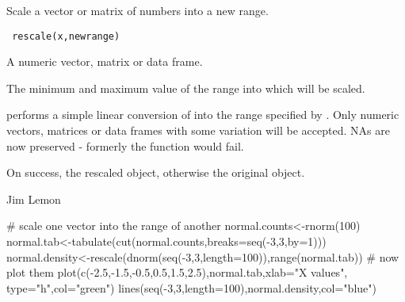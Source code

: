 \begin{Description}\relax
Scale a vector or matrix of numbers into a new range.
\end{Description}
\begin{Usage}
\begin{verbatim}
 rescale(x,newrange)
\end{verbatim}
\end{Usage}
\begin{Arguments}
\begin{ldescription}
\item[\code{x}] A numeric vector, matrix or data frame.
\item[\code{newrange}] The minimum and maximum value of the range into which
 will be scaled.
\end{ldescription}
\end{Arguments}
\begin{Details}\relax
{} performs a simple linear conversion of  into the
range specified by . Only numeric vectors, matrices or data
frames with some variation will be accepted. NAs are now preserved - 
formerly the function would fail.
\end{Details}
\begin{Value}
On success, the rescaled object, otherwise the original object.
\end{Value}
\begin{Author}\relax
Jim Lemon
\end{Author}
\begin{Examples}
\begin{ExampleCode}
 # scale one vector into the range of another
 normal.counts<-rnorm(100)
 normal.tab<-tabulate(cut(normal.counts,breaks=seq(-3,3,by=1)))
 normal.density<-rescale(dnorm(seq(-3,3,length=100)),range(normal.tab))
 # now plot them
 plot(c(-2.5,-1.5,-0.5,0.5,1.5,2.5),normal.tab,xlab="X values",
  type="h",col="green")
 lines(seq(-3,3,length=100),normal.density,col="blue")
\end{ExampleCode}
\end{Examples}

